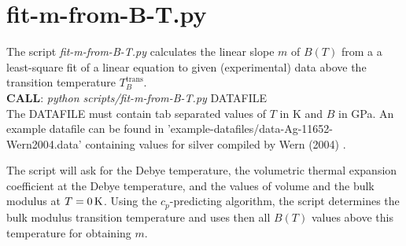 %
\section{fit-m-from-B-T.py}
The script \emph{fit-m-from-B-T.py} calculates the linear slope $m$ of $B(T)$ from a a least-square fit of a linear equation to given (experimental) data above the transition temperature $T_B^\text{trans}$.\\

\textbf{CALL}: \emph{python scripts/fit-m-from-B-T.py} DATAFILE\\

The DATAFILE must contain tab separated values of $T$ in K and $B$ in GPa. An example datafile can be found in 'example-datafiles/data-Ag-11652-Wern2004.data' containing values for silver compiled by Wern (2004) \cite{Wern2004}.

The script will ask for the Debye temperature, the volumetric thermal expansion coefficient at the Debye temperature, and the values of volume and the bulk modulus at $T=\unit[0]{K}$. Using the $c_p$-predicting algorithm, the script determines the bulk modulus transition temperature and uses then all $B(T)$ values above this temperature for obtaining $m$.

